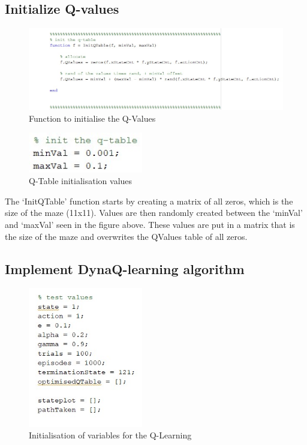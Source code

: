 \documentclass [11pt]{article}
\begin{document}
\subsection{Initialize Q-values}

\begin{figure}[H]
\centerline{\includegraphics[width=15cm]{initialise_q_values}}
\caption{Function to initialise the Q-Values}
\label{fig:init_q_vals}
\end{figure}

\begin{figure}[H]
\centerline{\includegraphics[width=5cm]{init_q_values_values}}
\caption{Q-Table initialisation values }
\label{fig:init_q_val_vlaues}
\end{figure}

The ‘InitQTable’ function starts by creating a matrix of all zeros, which is the size of the maze (11x11). Values are then randomly created between the ‘minVal’ and ‘maxVal’ seen in the figure above. These values are put in a matrix that is the size of the maze and overwrites the QValues table of all zeros. 

\subsection{Implement DynaQ-learning algorithm}

\begin{figure}[H]
\centerline{\includegraphics[width=5cm]{Q-learning_values}}
\caption{Initialisation of variables for the Q-Learning}
\label{fig:init_values_for_q_learning}
\end{figure}
\end{document}
